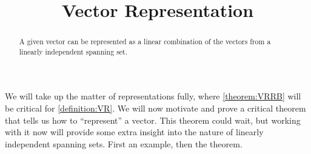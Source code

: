 \documentclass{ximera}
\title{Vector Representation}
\begin{document}
\begin{abstract}
  A given vector can be represented as a linear combination of the
  vectors from a linearly independent spanning set.
\end{abstract}
\maketitle

We will take up the matter of representations fully, where
\ref{theorem:VRRB} will be critical for \ref{definition:VR}.  We will
now motivate and prove a critical theorem that tells us how to
``represent'' a vector.  This theorem could wait, but working with it
now will provide some extra insight into the nature of linearly
independent spanning sets.  First an example, then the theorem.
\end{document}
